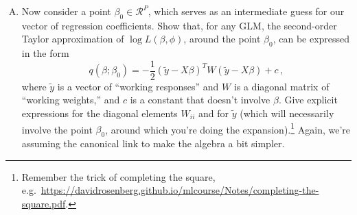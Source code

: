 \documentclass[11pt]{article}
\begin{document}
\begin{enumerate}[(A)]
\item Now consider a point $\beta_0 \in \mathcal{R}^P$, which serves as an intermediate guess for our vector of regression coefficients.  Show that, for any GLM, the second-order Taylor approximation of $\log L(\beta, \phi)$, around the point $\beta_0$, can be expressed in the form
$$
q(\beta; \beta_0) = -\frac{1}{2}(\tilde{y} - X \beta)^T W (\tilde{y} - X \beta) + c\, ,
$$
where $\tilde{y}$ is a vector of ``working responses'' and $W$ is a diagonal matrix of ``working weights,'' and $c$ is a constant that doesn't involve $\beta$.  Give explicit expressions for the diagonal elements $W_{ii}$ and for $\tilde{y}$ (which will necessarily involve the point $\beta_0$, around which you're doing the expansion).\footnote{Remember the trick of completing the square, e.g.~\url{https://davidrosenberg.github.io/mlcourse/Notes/completing-the-square.pdf}.} Again, we're assuming the canonical link to make the algebra a bit simpler.  


\end{enumerate}
\end{document}
